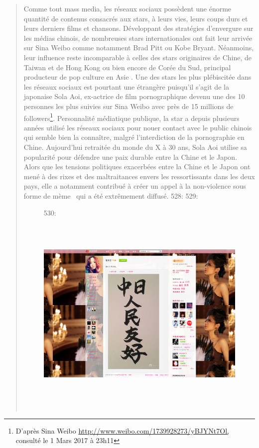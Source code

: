 \begin{quote}
\begin{description}
Comme tout mass media, les r\'eseaux sociaux poss\`edent une \'enorme quantit\'e de contenus consacr\'es aux stars, \`a leurs vies, leurs coups durs et leurs derniers films et chansons. D\'eveloppant des strat\'egies d{\textquoteright}envergure sur les m\'edias chinois, de nombreuses stars internationales ont fait leur arriv\'ee sur Sina Weibo comme notamment Brad Pitt ou Kobe Bryant. N\'eanmoins, leur influence reste incomparable \`a celles des stars originaires de Chine, de Taiwan et de Hong Kong ou bien encore de Cor\'ee du Sud, principal producteur de pop culture en Asie \cite{Martel2010}. Une des stars les plus pl\'ebiscit\'ee dans les r\'eseaux sociaux est pourtant une \'etrang\`ere puisqu{\textquoteright}il s{\textquoteright}agit de la japonaise Sola Aoi, ex-actrice de film pornographique devenu une des 10 personnes les plus suivies sur Sina Weibo avec pr\`es de 15 millions de followers\footnote{ D{\textquoteright}apr\`es Sina Weibo \url{http://www.weibo.com/1739928273/yBJYNt7Ol,} consult\'e le 1 Mars 2017 \`a 23h11}. Personnalit\'e m\'ediatique publique, la star a depuis plusieurs ann\'ees utilis\'e les r\'eseaux sociaux pour nouer contact avec le public chinois qui semble bien la conna\^itre, malgr\'e l{\textquoteright}interdiction de la pornographie en Chine. Aujourd{\textquoteright}hui retrait\'ee du monde du X \`a 30 ans, Sola Aoi utilise sa popularit\'e pour d\'efendre une paix durable entre la Chine et le Japon. Alors que les tensions politiques exacerb\'ees entre la Chine et le Japon ont men\'e \`a des rixes et des maltraitances envers les ressortissants dans les deux pays, elle a notamment contribu\'e \`a cr\'eer un appel \`a la non-violence sous forme de m\`eme \ qui a \'et\'e extr\^emement diffus\'e.  
528: 
529: \begin{figure}
530:     \includegraphics[width=6.0114in,height=4.0114in]{figures/chap2/chapitre2-img22.jpg}

\end{figure}
\end{description}
\end{quote}
